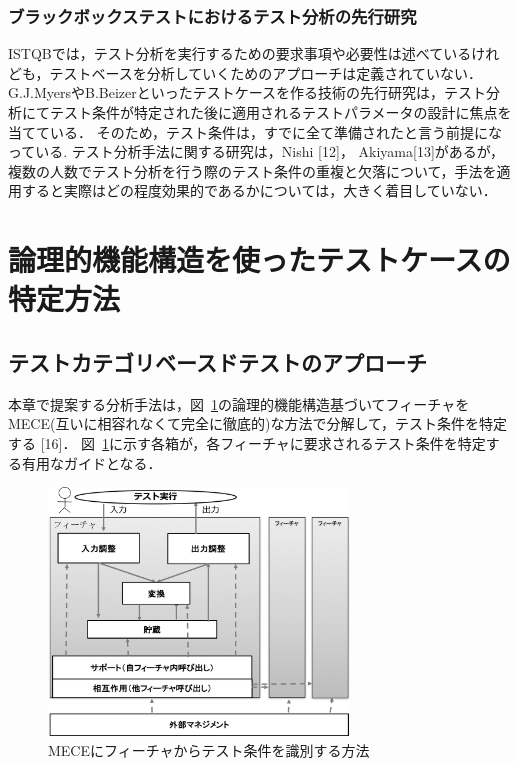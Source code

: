 \documentclass[a4paper,10pt]{jreport}
\begin{document}
\subsubsection{ブラックボックステストにおけるテスト分析の先行研究}
ISTQBでは，テスト分析を実行するための要求事項や必要性は述べているけれども，テストベースを分析していくためのアプローチは定義されていない．
G.J.MyersやB.Beizerといったテストケースを作る技術の先行研究は，テスト分析にてテスト条件が特定された後に適用されるテストパラメータの設計に焦点を当てている．
そのため，テスト条件は，すでに全て準備されたと言う前提になっている.
テスト分析手法に関する研究は，Nishi [12]， Akiyama[13]があるが，複数の人数でテスト分析を行う際のテスト条件の重複と欠落について，手法を適用すると実際はどの程度効果的であるかについては，大きく着目していない．


\section{論理的機能構造を使ったテストケースの特定方法}\label{chap:3}
\subsection{テストカテゴリベースドテストのアプローチ}
本章で提案する分析手法は，図~\ref{fig:D-3-Fig3}の論理的機能構造基づいてフィーチャをMECE(互いに相容れなくて完全に徹底的)な方法で分解して，テスト条件を特定する [16]．
図~\ref{fig:D-3-Fig3}に示す各箱が，各フィーチャに要求されるテスト条件を特定する有用なガイドとなる．

\begin{figure}[h]
  \begin{center}
  \includegraphics[width=8cm]{./image/D-3-Fig3.png}
  \caption{MECEにフィーチャからテスト条件を識別する方法}
  \label{fig:D-3-Fig3}
  \end{center}
   \end{figure}
\end{document}

